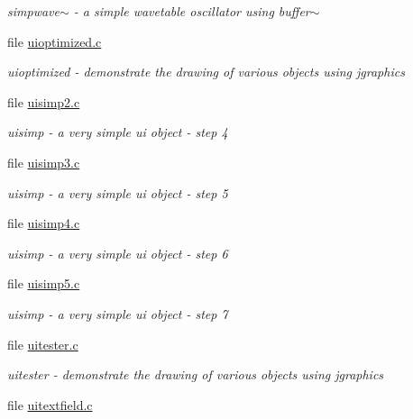\begin{DoxyCompactItemize}
\begin{DoxyCompactList}\small\item\em simpwave$\sim$ -\/ a simple wavetable oscillator using buffer$\sim$ \item\end{DoxyCompactList}\item 
file \hyperlink{uioptimized_8c}{uioptimized.c}


\begin{DoxyCompactList}\small\item\em uioptimized -\/ demonstrate the drawing of various objects using jgraphics \item\end{DoxyCompactList}\item 
file \hyperlink{uisimp2_8c}{uisimp2.c}


\begin{DoxyCompactList}\small\item\em uisimp -\/ a very simple ui object -\/ step 4 \item\end{DoxyCompactList}\item 
file \hyperlink{uisimp3_8c}{uisimp3.c}


\begin{DoxyCompactList}\small\item\em uisimp -\/ a very simple ui object -\/ step 5 \item\end{DoxyCompactList}\item 
file \hyperlink{uisimp4_8c}{uisimp4.c}


\begin{DoxyCompactList}\small\item\em uisimp -\/ a very simple ui object -\/ step 6 \item\end{DoxyCompactList}\item 
file \hyperlink{uisimp5_8c}{uisimp5.c}


\begin{DoxyCompactList}\small\item\em uisimp -\/ a very simple ui object -\/ step 7 \item\end{DoxyCompactList}\item 
file \hyperlink{uitester_8c}{uitester.c}


\begin{DoxyCompactList}\small\item\em uitester -\/ demonstrate the drawing of various objects using jgraphics \item\end{DoxyCompactList}\item 
file \hyperlink{uitextfield_8c}{uitextfield.c}



\end{DoxyCompactItemize}
